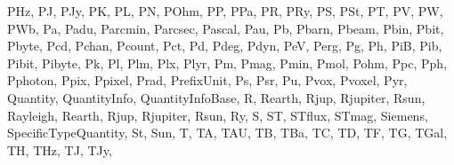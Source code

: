 \documentclass[letterpaper,10pt,english]{sphinxmanual}
\begin{document}
\begin{sphinxVerbatim}[commandchars=\\\{\}]
 \PYGZsq{}PHz\PYGZsq{},
 \PYGZsq{}PJ\PYGZsq{},
 \PYGZsq{}PJy\PYGZsq{},
 \PYGZsq{}PK\PYGZsq{},
 \PYGZsq{}PL\PYGZsq{},
 \PYGZsq{}PN\PYGZsq{},
 \PYGZsq{}POhm\PYGZsq{},
 \PYGZsq{}PP\PYGZsq{},
 \PYGZsq{}PPa\PYGZsq{},
 \PYGZsq{}PR\PYGZsq{},
 \PYGZsq{}PRy\PYGZsq{},
 \PYGZsq{}PS\PYGZsq{},
 \PYGZsq{}PSt\PYGZsq{},
 \PYGZsq{}PT\PYGZsq{},
 \PYGZsq{}PV\PYGZsq{},
 \PYGZsq{}PW\PYGZsq{},
 \PYGZsq{}PWb\PYGZsq{},
 \PYGZsq{}Pa\PYGZsq{},
 \PYGZsq{}Padu\PYGZsq{},
 \PYGZsq{}Parcmin\PYGZsq{},
 \PYGZsq{}Parcsec\PYGZsq{},
 \PYGZsq{}Pascal\PYGZsq{},
 \PYGZsq{}Pau\PYGZsq{},
 \PYGZsq{}Pb\PYGZsq{},
 \PYGZsq{}Pbarn\PYGZsq{},
 \PYGZsq{}Pbeam\PYGZsq{},
 \PYGZsq{}Pbin\PYGZsq{},
 \PYGZsq{}Pbit\PYGZsq{},
 \PYGZsq{}Pbyte\PYGZsq{},
 \PYGZsq{}Pcd\PYGZsq{},
 \PYGZsq{}Pchan\PYGZsq{},
 \PYGZsq{}Pcount\PYGZsq{},
 \PYGZsq{}Pct\PYGZsq{},
 \PYGZsq{}Pd\PYGZsq{},
 \PYGZsq{}Pdeg\PYGZsq{},
 \PYGZsq{}Pdyn\PYGZsq{},
 \PYGZsq{}PeV\PYGZsq{},
 \PYGZsq{}Perg\PYGZsq{},
 \PYGZsq{}Pg\PYGZsq{},
 \PYGZsq{}Ph\PYGZsq{},
 \PYGZsq{}PiB\PYGZsq{},
 \PYGZsq{}Pib\PYGZsq{},
 \PYGZsq{}Pibit\PYGZsq{},
 \PYGZsq{}Pibyte\PYGZsq{},
 \PYGZsq{}Pk\PYGZsq{},
 \PYGZsq{}Pl\PYGZsq{},
 \PYGZsq{}Plm\PYGZsq{},
 \PYGZsq{}Plx\PYGZsq{},
 \PYGZsq{}Plyr\PYGZsq{},
 \PYGZsq{}Pm\PYGZsq{},
 \PYGZsq{}Pmag\PYGZsq{},
 \PYGZsq{}Pmin\PYGZsq{},
 \PYGZsq{}Pmol\PYGZsq{},
 \PYGZsq{}Pohm\PYGZsq{},
 \PYGZsq{}Ppc\PYGZsq{},
 \PYGZsq{}Pph\PYGZsq{},
 \PYGZsq{}Pphoton\PYGZsq{},
 \PYGZsq{}Ppix\PYGZsq{},
 \PYGZsq{}Ppixel\PYGZsq{},
 \PYGZsq{}Prad\PYGZsq{},
 \PYGZsq{}PrefixUnit\PYGZsq{},
 \PYGZsq{}Ps\PYGZsq{},
 \PYGZsq{}Psr\PYGZsq{},
 \PYGZsq{}Pu\PYGZsq{},
 \PYGZsq{}Pvox\PYGZsq{},
 \PYGZsq{}Pvoxel\PYGZsq{},
 \PYGZsq{}Pyr\PYGZsq{},
 \PYGZsq{}Quantity\PYGZsq{},
 \PYGZsq{}QuantityInfo\PYGZsq{},
 \PYGZsq{}QuantityInfoBase\PYGZsq{},
 \PYGZsq{}R\PYGZsq{},
 \PYGZsq{}R\PYGZus{}earth\PYGZsq{},
 \PYGZsq{}R\PYGZus{}jup\PYGZsq{},
 \PYGZsq{}R\PYGZus{}jupiter\PYGZsq{},
 \PYGZsq{}R\PYGZus{}sun\PYGZsq{},
 \PYGZsq{}Rayleigh\PYGZsq{},
 \PYGZsq{}Rearth\PYGZsq{},
 \PYGZsq{}Rjup\PYGZsq{},
 \PYGZsq{}Rjupiter\PYGZsq{},
 \PYGZsq{}Rsun\PYGZsq{},
 \PYGZsq{}Ry\PYGZsq{},
 \PYGZsq{}S\PYGZsq{},
 \PYGZsq{}ST\PYGZsq{},
 \PYGZsq{}STflux\PYGZsq{},
 \PYGZsq{}STmag\PYGZsq{},
 \PYGZsq{}Siemens\PYGZsq{},
 \PYGZsq{}SpecificTypeQuantity\PYGZsq{},
 \PYGZsq{}St\PYGZsq{},
 \PYGZsq{}Sun\PYGZsq{},
 \PYGZsq{}T\PYGZsq{},
 \PYGZsq{}TA\PYGZsq{},
 \PYGZsq{}TAU\PYGZsq{},
 \PYGZsq{}TB\PYGZsq{},
 \PYGZsq{}TBa\PYGZsq{},
 \PYGZsq{}TC\PYGZsq{},
 \PYGZsq{}TD\PYGZsq{},
 \PYGZsq{}TF\PYGZsq{},
 \PYGZsq{}TG\PYGZsq{},
 \PYGZsq{}TGal\PYGZsq{},
 \PYGZsq{}TH\PYGZsq{},
 \PYGZsq{}THz\PYGZsq{},
 \PYGZsq{}TJ\PYGZsq{},
 \PYGZsq{}TJy\PYGZsq{},

\end{sphinxVerbatim}
\end{document}
